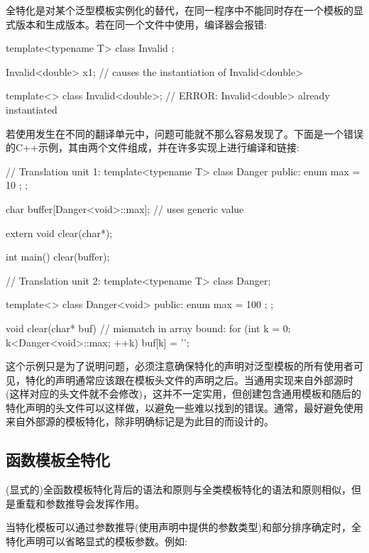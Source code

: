 全特化是对某个泛型模板实例化的替代，在同一程序中不能同时存在一个模板的显式版本和生成版本。若在同一个文件中使用，编译器会报错:

\begin{cpp}
template<typename T>
class Invalid {
};

Invalid<double> x1; // causes the instantiation of Invalid<double>

template<>
class Invalid<double>; // ERROR: Invalid<double> already instantiated
\end{cpp}

若使用发生在不同的翻译单元中，问题可能就不那么容易发现了。下面是一个错误的C++示例，其由两个文件组成，并在许多实现上进行编译和链接:

\begin{cpp}
// Translation unit 1:
template<typename T>
class Danger {
	public:
	enum { max = 10 };
};

char buffer[Danger<void>::max]; // uses generic value

extern void clear(char*);

int main()
{
	clear(buffer);
}

// Translation unit 2:
template<typename T>
class Danger;

template<>
class Danger<void> {
	public:
	enum { max = 100 };
};

void clear(char* buf)
{
	// mismatch in array bound:
	for (int k = 0; k<Danger<void>::max; ++k) {
		buf[k] = '\0';
	}
}
\end{cpp}

这个示例只是为了说明问题，必须注意确保特化的声明对泛型模板的所有使用者可见，特化的声明通常应该跟在模板头文件的声明之后。当通用实现来自外部源时(这样对应的头文件就不会修改)，这并不一定实用，但创建包含通用模板和随后的特化声明的头文件可以这样做，以避免一些难以找到的错误。通常，最好避免使用来自外部源的模板特化，除非明确标记是为此目的而设计的。

\subsection{函数模板全特化}

(显式的)全函数模板特化背后的语法和原则与全类模板特化的语法和原则相似，但是重载和参数推导会发挥作用。

当特化模板可以通过参数推导(使用声明中提供的参数类型)和部分排序确定时，全特化声明可以省略显式的模板参数。例如:


